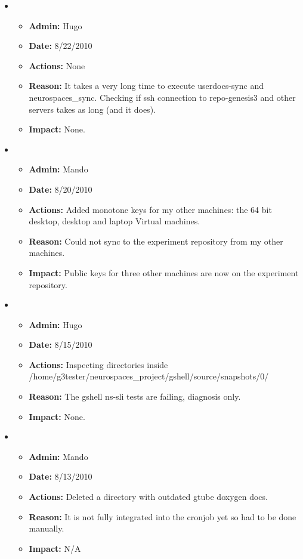 \documentclass[12pt]{article}
\begin{document}
\begin{itemize}
\item 
\begin{itemize}
\item[] {\bf Admin:} Hugo
\item[] {\bf Date:} 8/22/2010 
\item[] {\bf Actions:} None
\item[] {\bf Reason:} It takes a very long time to execute
  userdocs-sync and neurospaces\_sync.  Checking if ssh connection to
  repo-genesis3 and other servers takes as long (and it does).
\item[] {\bf Impact:} None.
\end{itemize}

\item 
\begin{itemize}
\item[] {\bf Admin:} Mando
\item[] {\bf Date:} 8/20/2010 
\item[] {\bf Actions:} Added monotone keys for my other machines: the 64 bit desktop, desktop and laptop Virtual machines.
\item[] {\bf Reason:} Could not sync to the experiment repository from my other machines.
\item[] {\bf Impact:} Public keys for three other machines are now on the experiment repository.
\end{itemize}
	
\item 
\begin{itemize}
\item[] {\bf Admin:} Hugo
\item[] {\bf Date:} 8/15/2010 
\item[] {\bf Actions:} Inspecting directories inside
  /home/g3tester/neurospaces\_project/gshell/source/snapshots/0/
\item[] {\bf Reason:} The gshell ns-sli tests are failing, diagnosis
  only.
\item[] {\bf Impact:} None.
\end{itemize}

\item 
\begin{itemize}
\item[] {\bf Admin:} Mando
\item[] {\bf Date:} 8/13/2010 
\item[] {\bf Actions:} Deleted a directory with outdated gtube doxygen docs.
\item[] {\bf Reason:} It is not fully integrated into the cronjob yet so had to be done manually.
\item[] {\bf Impact:} N/A
\end{itemize}


\end{itemize}
\end{document}
